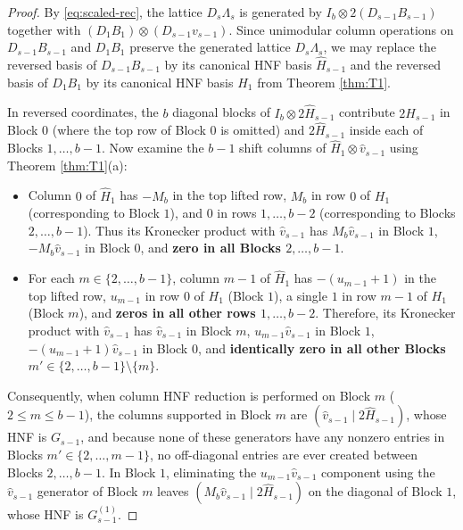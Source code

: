 \documentclass[11pt,a4paper]{article}
\theoremstyle{plain}
\theoremstyle{definition}
\begin{document}
\begin{proof}
By \eqref{eq:scaled-rec}, the lattice $D_s \Lambda_s$ is generated by $I_b \otimes 2(D_{s-1} B_{s-1})$ together with $(D_1 B_1) \otimes (D_{s-1} v_{s-1})$. Since unimodular column operations on $D_{s-1} B_{s-1}$ and $D_1 B_1$ preserve the generated lattice $D_s \Lambda_s$, we may replace the reversed basis of $D_{s-1} B_{s-1}$ by its canonical HNF basis $\hat{H}_{s-1}$ and the reversed basis of $D_1 B_1$ by its canonical HNF basis $\hat{H}_1$ from Theorem \ref{thm:T1}.

In reversed coordinates, the $b$ diagonal blocks of $I_b \otimes 2\hat{H}_{s-1}$ contribute $2 H_{s-1}$ in Block $0$ (where the top row of Block $0$ is omitted) and $2 \hat{H}_{s-1}$ inside each of Blocks $1, \dots, b-1$. Now examine the $b-1$ shift columns of $\hat{H}_1 \otimes \hat{v}_{s-1}$ using Theorem \ref{thm:T1}(a):
\begin{itemize}
\item Column $0$ of $\hat{H}_1$ has $-M_b$ in the top lifted row, $M_b$ in row $0$ of $H_1$ (corresponding to Block $1$), and $0$ in rows $1, \dots, b-2$ (corresponding to Blocks $2, \dots, b-1$). Thus its Kronecker product with $\hat{v}_{s-1}$ has $M_b \hat{v}_{s-1}$ in Block $1$, $-M_b \hat{v}_{s-1}$ in Block $0$, and \textbf{zero in all Blocks $2, \dots, b-1$}.
\item For each $m \in \{2, \dots, b-1\}$, column $m-1$ of $\hat{H}_1$ has $-(u_{m-1}+1)$ in the top lifted row, $u_{m-1}$ in row $0$ of $H_1$ (Block $1$), a single $1$ in row $m-1$ of $H_1$ (Block $m$), and \textbf{zeros in all other rows $1, \dots, b-2$}. Therefore, its Kronecker product with $\hat{v}_{s-1}$ has $\hat{v}_{s-1}$ in Block $m$, $u_{m-1}\hat{v}_{s-1}$ in Block $1$, $-(u_{m-1}+1)\hat{v}_{s-1}$ in Block $0$, and \textbf{identically zero in all other Blocks $m' \in \{2, \dots, b-1\} \setminus \{m\}$}.
\end{itemize}
Consequently, when column HNF reduction is performed on Block $m$ ($2 \le m \le b-1$), the columns supported in Block $m$ are $(\hat{v}_{s-1} \mid 2\hat{H}_{s-1})$, whose HNF is $G_{s-1}$, and because none of these generators have any nonzero entries in Blocks $m' \in \{2, \dots, m-1\}$, no off-diagonal entries are ever created between Blocks $2, \dots, b-1$. In Block $1$, eliminating the $u_{m-1}\hat{v}_{s-1}$ component using the $\hat{v}_{s-1}$ generator of Block $m$ leaves $(M_b \hat{v}_{s-1} \mid 2\hat{H}_{s-1})$ on the diagonal of Block $1$, whose HNF is $G_{s-1}^{(1)}$.


\end{proof}
\end{document}
